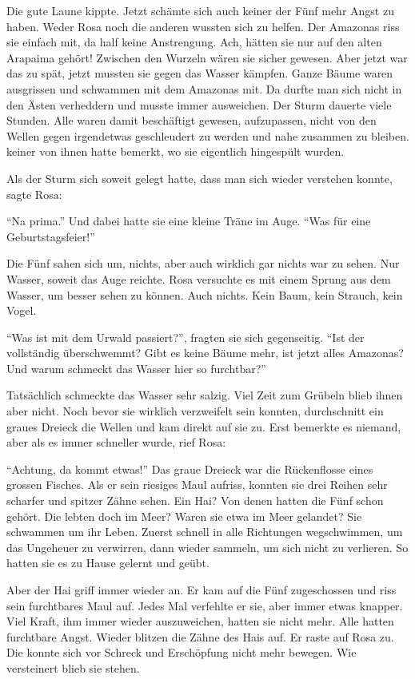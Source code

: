 Die gute Laune kippte. Jetzt schämte sich auch keiner der Fünf mehr Angst zu haben. Weder Rosa noch die anderen wussten sich zu helfen. Der Amazonas riss sie einfach mit, da half keine Anstrengung. Ach, hätten sie nur auf den alten Arapaima gehört! Zwischen den Wurzeln wären sie sicher gewesen. Aber jetzt war das zu spät, jetzt mussten sie gegen das Wasser kämpfen. Ganze Bäume waren ausgrissen und schwammen mit dem Amazonas mit. Da durfte man sich nicht in den Ästen verheddern und musste immer ausweichen. Der Sturm dauerte viele Stunden. Alle waren damit beschäftigt gewesen, aufzupassen, nicht von den Wellen gegen irgendetwas geschleudert zu werden und nahe zusammen zu bleiben. keiner von ihnen hatte bemerkt, wo sie eigentlich hingespült wurden.

Als der Sturm sich soweit gelegt hatte, dass man sich wieder verstehen konnte, sagte Rosa:

\enquote{Na prima.} Und dabei hatte sie eine kleine Träne im Auge. \enquote{Was für eine Geburtstagsfeier!}

Die Fünf sahen sich um, nichts, aber auch wirklich gar nichts war zu sehen. Nur Wasser, soweit das Auge reichte. Rosa versuchte es mit einem Sprung aus dem Wasser, um besser sehen zu können. Auch nichts. Kein Baum, kein Strauch, kein Vogel.

\enquote{Was ist mit dem Urwald passiert?}, fragten sie sich gegenseitig. \enquote{Ist der vollständig überschwemmt? Gibt es keine Bäume mehr, ist jetzt alles Amazonas? Und warum schmeckt das Wasser hier so furchtbar?} 

Tatsächlich schmeckte das Wasser sehr salzig. Viel Zeit zum Grübeln blieb ihnen aber nicht. Noch bevor sie wirklich verzweifelt sein konnten, durchschnitt ein graues Dreieck die Wellen und kam direkt auf sie zu. Erst bemerkte es niemand, aber als es immer schneller wurde, rief Rosa:

\enquote{Achtung, da kommt etwas!} Das graue Dreieck war die Rückenflosse eines grossen Fisches. Als er sein riesiges Maul aufriss, konnten sie drei Reihen sehr scharfer und spitzer Zähne sehen. Ein Hai? Von denen hatten die Fünf schon gehört. Die lebten doch im Meer? Waren sie etwa im Meer gelandet? Sie schwammen um ihr Leben. Zuerst schnell in alle Richtungen wegschwimmen, um das Ungeheuer zu verwirren, dann wieder sammeln, um sich nicht zu verlieren. So hatten sie es zu Hause gelernt und geübt.

Aber der Hai griff immer wieder an. Er kam auf die Fünf zugeschossen und riss sein furchtbares Maul auf. Jedes Mal verfehlte er sie, aber immer etwas knapper. Viel Kraft, ihm immer wieder auszuweichen, hatten sie nicht mehr. Alle hatten furchtbare Angst. Wieder blitzen die Zähne des Hais auf. Er raste auf Rosa zu. Die konnte sich vor Schreck und Erschöpfung nicht mehr bewegen. Wie versteinert blieb sie stehen. 

